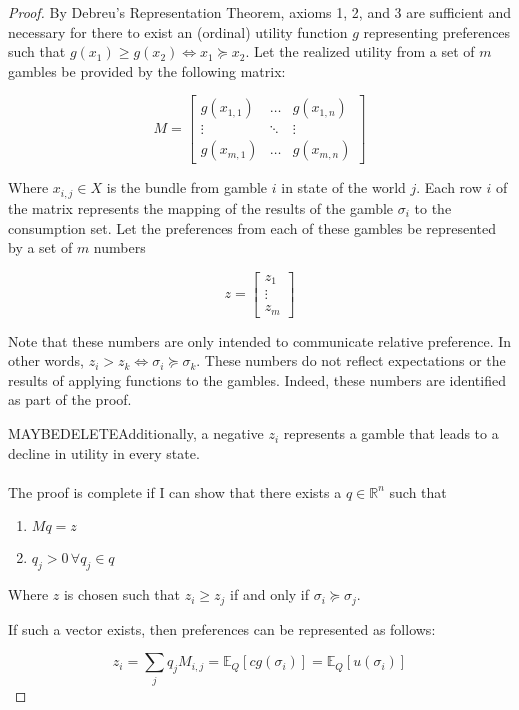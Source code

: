 \documentclass{article}
\begin{document}
\begin{proof}
By Debreu's Representation Theorem, axioms 1, 2, and 3 are sufficient and necessary for there to exist an (ordinal) utility function \(g\) representing preferences such that \(g(x_1)\geq g(x_2) \Leftrightarrow x_1 \succeq x_2 \).  Let the realized utility from a set of \(m\) gambles be provided by the following matrix:

\[M=\begin{bmatrix}
	g(x_{1, 1}) & \ldots & g(x_{1, n})\\
	\vdots & \ddots & \vdots \\
	g(x_{m, 1}) & \ldots & g(x_{m, n})
\end{bmatrix}
\]

Where \(x_{i, j} \in X\) is the bundle from gamble \(i\) in state of the world \(j\).  Each row  \(i\) of the matrix represents the mapping of the results of the gamble \(\sigma_i\) to the consumption set. Let the preferences from each of these gambles be represented by a set of \(m\) numbers

\[z=\begin{bmatrix}
z_1 \\ \vdots\\ z_m
\end{bmatrix}\]


Note that these numbers are only intended to communicate relative preference.  In other words, \(z_i > z_k \Leftrightarrow \sigma_i \succeq \sigma_k\).  These numbers do not reflect expectations or the results of applying functions to the gambles.  Indeed, these numbers are identified as part of the proof.

MAYBEDELETEAdditionally, a negative \(z_i\) represents a gamble that leads to a decline in utility in every state.   
\\
\\
The proof is complete if I can show that there exists a \(q \in \mathbb{R}^n\) such that 
\begin{enumerate}
	\item \(Mq=z\)
	\item \(q_j>0 \, \forall q_j \in q\)
\end{enumerate}
Where \(z\) is chosen such that \(z_i \geq z_j\) if and only if  \(\sigma_i \succeq \sigma_j\).

If such a vector exists, then preferences can be represented as follows:

\[z_i=\sum_j q_j M_{i, j} = \mathbb{E}_Q \left[ c g(\sigma_i) \right] =\mathbb{E}_Q\left[u(\sigma_i)\right] \]


\end{proof}
\end{document}
